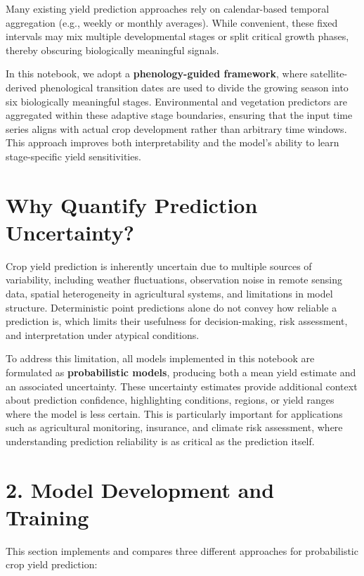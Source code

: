 \documentclass[
  letterpaper,
  DIV=11,
  numbers=noendperiod]{scrreprt}
\begin{document}
Many existing yield prediction approaches rely on calendar-based
temporal aggregation (e.g., weekly or monthly averages). While
convenient, these fixed intervals may mix multiple developmental stages
or split critical growth phases, thereby obscuring biologically
meaningful signals.

In this notebook, we adopt a \textbf{phenology-guided framework}, where
satellite- derived phenological transition dates are used to divide the
growing season into six biologically meaningful stages. Environmental
and vegetation predictors are aggregated within these adaptive stage
boundaries, ensuring that the input time series aligns with actual crop
development rather than arbitrary time windows. This approach improves
both interpretability and the model's ability to learn stage-specific
yield sensitivities.

\section{Why Quantify Prediction
Uncertainty?}\label{why-quantify-prediction-uncertainty}

Crop yield prediction is inherently uncertain due to multiple sources of
variability, including weather fluctuations, observation noise in remote
sensing data, spatial heterogeneity in agricultural systems, and
limitations in model structure. Deterministic point predictions alone do
not convey how reliable a prediction is, which limits their usefulness
for decision-making, risk assessment, and interpretation under atypical
conditions.

To address this limitation, all models implemented in this notebook are
formulated as \textbf{probabilistic models}, producing both a mean yield
estimate and an associated uncertainty. These uncertainty estimates
provide additional context about prediction confidence, highlighting
conditions, regions, or yield ranges where the model is less certain.
This is particularly important for applications such as agricultural
monitoring, insurance, and climate risk assessment, where understanding
prediction reliability is as critical as the prediction itself.

\section{2. Model Development and
Training}\label{model-development-and-training}

This section implements and compares three different approaches for
probabilistic crop yield prediction:
\end{document}
